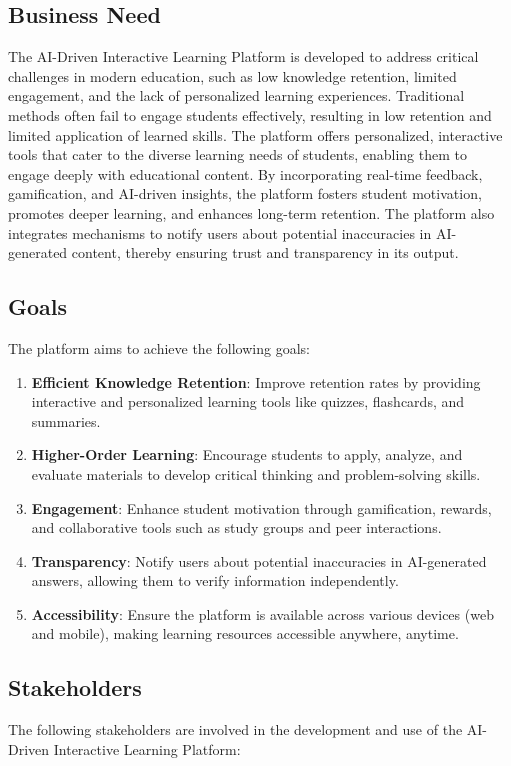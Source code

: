 \documentclass[12pt]{article}
\begin{document}
\subsection{Business Need}
The AI-Driven Interactive Learning Platform is developed to address critical challenges in modern education, such as low knowledge retention, limited engagement, and the lack of personalized learning experiences. Traditional methods often fail to engage students effectively, resulting in low retention and limited application of learned skills. The platform offers personalized, interactive tools that cater to the diverse learning needs of students, enabling them to engage deeply with educational content. By incorporating real-time feedback, gamification, and AI-driven insights, the platform fosters student motivation, promotes deeper learning, and enhances long-term retention. The platform also integrates mechanisms to notify users about potential inaccuracies in AI-generated content, thereby ensuring trust and transparency in its output.


\subsection{Goals}
The platform aims to achieve the following goals:
\begin{enumerate}
    \item \textbf{Efficient Knowledge Retention}: Improve retention rates by providing interactive and personalized learning tools like quizzes, flashcards, and summaries.
    \item \textbf{Higher-Order Learning}: Encourage students to apply, analyze, and evaluate materials to develop critical thinking and problem-solving skills.
    \item \textbf{Engagement}: Enhance student motivation through gamification, rewards, and collaborative tools such as study groups and peer interactions.
    \item \textbf{Transparency}: Notify users about potential inaccuracies in AI-generated answers, allowing them to verify information independently.
    \item \textbf{Accessibility}: Ensure the platform is available across various devices (web and mobile), making learning resources accessible anywhere, anytime.
\end{enumerate}

\subsection{Stakeholders}
The following stakeholders are involved in the development and use of the AI-Driven Interactive Learning Platform:
\end{document}
